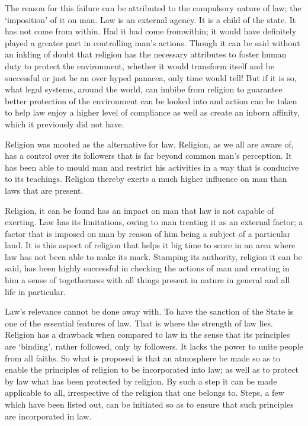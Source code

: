\begin{multicols}{2}
\vspace{-.1cm}

\noi
The reason for this failure can be attributed to the compulsory nature of law; the ‘imposition’
of it on man. Law is an external agency. It is a child of the state. It has not come from within.
Had it had come fromwithin; it would have definitely played a greater part in controlling man’s
actions. Though it can be said without an inkling of doubt that religion has the necessary
attributes to foster human duty to protect the environment, whether it would transform itself
and be successful or just be an over hyped panacea, only time would tell! But if it is so, what
legal systems, around the world, can imbibe from religion to guarantee better protection of the
environment can be looked into and action can be taken to help law enjoy a higher level of
compliance as well as create an inborn affinity, which it previously did not have.

\vspace{-.2cm}


\vspace{-.1cm}

\noi
Religion was mooted as the alternative for law. Religion, as we all are aware of, has a control
over its followers that is far beyond common man’s perception. It has been able to mould man
and restrict his activities in a way that is conducive to its teachings. Religion thereby exerts a
much higher influence on man than laws that are present.

\noi
Religion, it can be found has an impact on man that law is not capable of exerting. Law has
its limitations, owing to man treating it as an external factor; a factor that is imposed on man
by reason of him being a subject of a particular land. It is this aspect of religion that helps it
big time to score in an area where law has not been able to make its mark. Stamping its
authority, religion it can be said, has been highly successful in checking the actions of man and
creating in him a sense of togetherness with all things present in nature in general and all life
in particular.


Law’s relevance cannot be done away with. To have the sanction of the State is one of the
essential features of law. That is where the strength of law lies. Religion has a drawback when
compared to law in the sense that its principles are ‘binding’, rather followed, only by
followers. It lacks the power to unite people from all faiths. So what is proposed is that an 
atmosphere be made so as to enable the principles of religion to be incorporated into law; as
well as to protect by law what has been protected by religion. By such a step it can be made
applicable to all, irrespective of the religion that one belongs to. Steps, a few which have been
listed out, can be initiated so as to ensure that such principles are incorporated in law.


\end{multicols}
